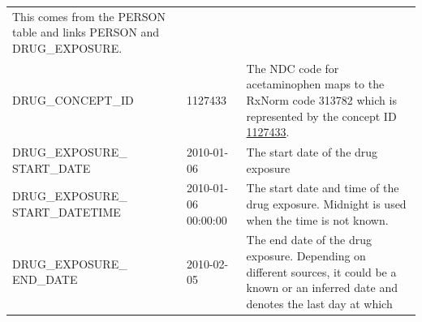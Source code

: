 \documentclass[]{book}
\begin{document}
\begin{longtable}[]{@{}lll@{}}
\begin{minipage}[t]{0.47\columnwidth}
This comes from the PERSON table and links PERSON and
DRUG\_EXPOSURE.\strut
\end{minipage}\tabularnewline
\begin{minipage}[t]{0.30\columnwidth}\raggedright\strut
DRUG\_CONCEPT\_ID\strut
\end{minipage} & \begin{minipage}[t]{0.14\columnwidth}\raggedright\strut
1127433\strut
\end{minipage} & \begin{minipage}[t]{0.47\columnwidth}\raggedright\strut
The NDC code for acetaminophen maps to the RxNorm code 313782 which is
represented by the concept ID
\href{http://athena.ohdsi.org/search-terms/terms/1127433}{1127433}.\strut
\end{minipage}\tabularnewline
\begin{minipage}[t]{0.30\columnwidth}\raggedright\strut
DRUG\_EXPOSURE\_ START\_DATE\strut
\end{minipage} & \begin{minipage}[t]{0.14\columnwidth}\raggedright\strut
2010-01-06\strut
\end{minipage} & \begin{minipage}[t]{0.47\columnwidth}\raggedright\strut
The start date of the drug exposure\strut
\end{minipage}\tabularnewline
\begin{minipage}[t]{0.30\columnwidth}\raggedright\strut
DRUG\_EXPOSURE\_ START\_DATETIME\strut
\end{minipage} & \begin{minipage}[t]{0.14\columnwidth}\raggedright\strut
2010-01-06 00:00:00\strut
\end{minipage} & \begin{minipage}[t]{0.47\columnwidth}\raggedright\strut
The start date and time of the drug exposure. Midnight is used when the
time is not known.\strut
\end{minipage}\tabularnewline
\begin{minipage}[t]{0.30\columnwidth}\raggedright\strut
DRUG\_EXPOSURE\_ END\_DATE\strut
\end{minipage} & \begin{minipage}[t]{0.14\columnwidth}\raggedright\strut
2010-02-05\strut
\end{minipage} & \begin{minipage}[t]{0.47\columnwidth}\raggedright\strut
The end date of the drug exposure. Depending on different sources, it
could be a known or an inferred date and denotes the last day at which

\end{minipage}
\end{longtable}
\end{document}
